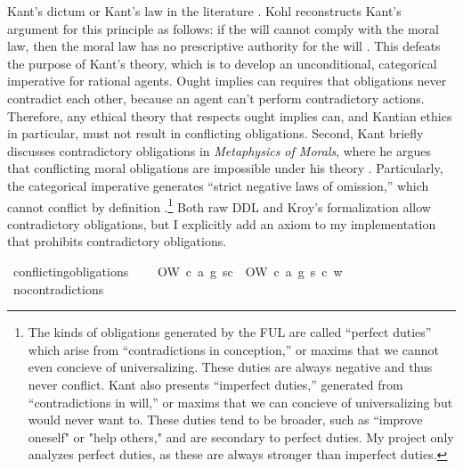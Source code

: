 \begin{isabellebody}
\begin{isamarkuptext}
{Kant's dictum or Kant's law in the literature \citep[footnote 1]{kohl}.} Kohl reconstructs Kant's argument for this principle as 
follows: if the will cannot comply with the moral law, then the moral law has no prescriptive authority 
for the will \citep[703-4]{kohl}. This defeats the purpose of Kant's theory, which is to develop an unconditional, categorical imperative 
for rational agents. Ought implies can requires that obligations never contradict each other, because an agent 
can't perform contradictory actions. Therefore, any ethical theory that respects ought implies can, 
and Kantian ethics in particular, must not result in conflicting obligations. 
Second, Kant briefly discusses contradictory obligations in \emph{Metaphysics of Morals}, where he argues that 
conflicting moral obligations are impossible under his theory \citep[V224]{metaphysicsintro}. Particularly, the categorical imperative generates 
``strict negative laws of omission,'' which cannot conflict by definition \citep[45]{timmerman}.\footnote{The 
kinds of obligations generated by the FUL are called ``perfect duties'' which arise from ``contradictions 
in conception,'' or maxims that we cannot even concieve of universalizing. These duties are always negative 
and thus never conflict. Kant also presents ``imperfect duties,'' generated from ``contradictions in will,''
or maxims that we can concieve of universalizing but would never want to. These duties tend to be broader, 
such as ``improve oneself" or "help others," and are secondary to perfect duties. My project only analyzes 
perfect duties, as these are always stronger than imperfect duties.} Both raw DDL and 
Kroy's formalization allow contradictory obligations, but I explicitly add an axiom to my implementation
that prohibits contradictory obligations.%
\end{isamarkuptext}\isamarkuptrue%
\isamarkupfalse%
\ conflicting{\isacharunderscore}obligations{\isacharcolon}\isanewline
\ \ \ {\isachardoublequoteopen}{\isasymnot}\ {\isacharparenleft}O{\isacharbraceleft}W\ {\isacharparenleft}c{\isacharcomma}\ a{\isacharcomma}\ g{\isacharparenright}\ s{\isacharbar}c{\isacharbraceright}\ \isactrlbold {\isasymand}\ O{\isacharbraceleft}\isactrlbold {\isasymnot}{\isacharparenleft}W\ {\isacharparenleft}c{\isacharcomma}\ a{\isacharcomma}\ g{\isacharparenright}\ s{\isacharparenright}{\isacharbar}\ c{\isacharbraceright}{\isacharparenright}\ w{\isachardoublequoteclose}\isanewline
%
\isadelimproof
\ \ %
\endisadelimproof
%
\isatagproof
{}\isamarkupfalse%
\ no{\isacharunderscore}contradictions\ \isamarkupfalse%

\end{isabellebody}
